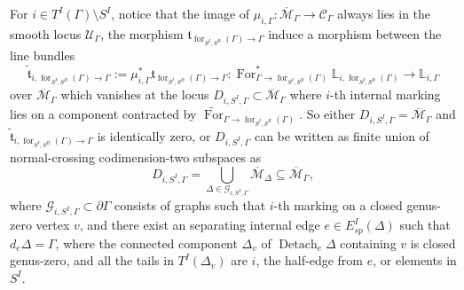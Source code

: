 \documentclass[11pt]{amsart}
\theoremstyle{definition}
\theoremstyle{remark}
\renewcommand{\for}{\operatorname{for}}
\newcommand{\For}{\operatorname{For}}
\newcommand{\<}{\left<}
\renewcommand{\>}{\right>}
\numberwithin{equation}{section}
\def\Mbar{{\overline{\mathcal M}}}
\begin{document}
For $i\in T^I(\Gamma)\setminus S^I$, notice that the image of $\mu_{i,\Gamma}\colon \Mbar_{\Gamma}\to \mathcal C_\Gamma$ always lies in the smooth locus %
$\mathcal U_{\Gamma}$, the %
morphism  %
$\mathfrak t_{\for_{{S^I,S^B}}(\Gamma)\to \Gamma}$ induce a %
morphism between the line bundles $$\tilde{\mathfrak t}_{i,\for_{{S^I,S^B}}(\Gamma)\to \Gamma}:=  \mu_{i,\Gamma}^*\mathfrak t_{\for_{{S^I,S^B}}(\Gamma)\to \Gamma}\colon \For_{\Gamma\to \for_{{S^I,S^B}}(\Gamma)}^*\mathbb L_{i,\for_{{S^I,S^B}}(\Gamma)}\to \mathbb L_{i,\Gamma}$$ over $\Mbar_\Gamma$ which vanishes at the locus $D_{i,S^I,\Gamma}\subset \Mbar_\Gamma$ where $i$-th internal marking lies on a component contracted by $\widetilde{\For}_{\Gamma\to \for_{{S^I,S^B}}(\Gamma)}$. So either $D_{i,S^I,\Gamma}= \Mbar_\Gamma$ and $\tilde{\mathfrak t}_{i,\for_{{S^I,S^B}}(\Gamma)\to \Gamma}$ is identically zero, or $D_{i,S^I,\Gamma}$ can be written as finite union of normal-crossing codimension-two subspaces as
$$
D_{i,S^I,\Gamma}=\bigcup_{\Delta \in \mathcal G_{i,S^I,\Gamma}} \Mbar_{\Delta} \subseteq\Mbar_{\Gamma},
$$
where $\mathcal G_{i,S^I,\Gamma}\subset \partial \Gamma$ consists of graphs such that $i$-th marking on a closed genus-zero vertex $v$, and %
there exist an separating %
internal edge $e\in E^I_{sp}(\Delta)$ such that $d_e\Delta=\Gamma$, where the connected component $\Delta_v$ of $\operatorname{Detach}_e \Delta$ containing $v$ is closed genus-zero, and  all the tails in $T^I(\Delta_v)$ are $i$, the half-edge from $e$, or elements in $S^I$. 
\end{document}
